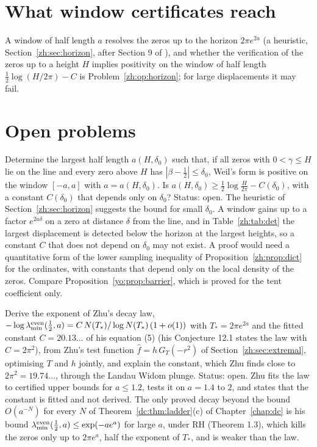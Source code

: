 \section{What window certificates reach}\label{zh:sec:closer}

A window of half length $a$ resolves the zeros up to the horizon $2\pi e^{2a}$ (a heuristic, Section~\ref{zh:sec:horizon}, after Section 9 of \cite{Zhu26}), and whether the verification of the zeros up to a height $H$ implies positivity on the window of half length $\frac12\log(H/2\pi)-C$ is Problem~\ref{zh:op:horizon}; for large displacements it may fail.

\section{Open problems}\label{zh:sec:open}

\begin{problem}\label{zh:op:horizon}
Determine the largest half length $a(H,\delta_0)$ such that, if all zeros with $0<\gamma\le H$ lie on the line and every zero above $H$ has $|\beta-\frac12|\le\delta_0$, Weil's form is positive on the window $[-a,a]$ with $a=a(H,\delta_0)$. Is $a(H,\delta_0)\ge\frac12\log\frac H{2\pi}-C(\delta_0)$, with a constant $C(\delta_0)$ that depends only on $\delta_0$? Status: open. The heuristic of Section~\ref{zh:sec:horizon} suggests the bound for small $\delta_0$. A window gains up to a factor $e^{2a\delta}$ on a zero at distance $\delta$ from the line, and in Table~\ref{zh:tab:det} the largest displacement is detected below the horizon at the largest heights, so a constant $C$ that does not depend on $\delta_0$ may not exist. A proof would need a quantitative form of the lower sampling inequality of Proposition~\ref{zh:prop:dict} for the ordinates, with constants that depend only on the local density of the zeros. Compare Proposition~\ref{yo:prop:barrier}, which is proved for the tent coefficient only.
\end{problem}

\begin{problem}\label{zh:op:decay}
Derive the exponent of Zhu's decay law, $-\log\lambda_{\min}^{\rm even}(\frac12,a)=C\,N(T_*)/\log N(T_*)\,(1+o(1))$ with $T_*=2\pi e^{2a}$ and the fitted constant $C=20.13\ldots$ of his equation (5) (his Conjecture 12.1 \cite{Zhu26} states the law with $C=2\pi^2$), from Zhu's test function $\widehat f=h\,G_T(-r^2)$ of Section~\ref{zh:sec:extremal}, optimising $T$ and $h$ jointly, and explain the constant, which Zhu finds close to $2\pi^2=19.74\ldots$, through the Landau Widom plunge. Status: open. Zhu fits the law to certified upper bounds for $a\le1.2$, tests it on $a=1.4$ to $2$, and states that the constant is fitted and not derived. The only proved decay beyond the bound $O(a^{-N})$ for every $N$ of Theorem~\ref{dc:thm:ladder}(c) of Chapter~\ref{chap:dc} is his bound $\lambda_{\min}^{\rm even}(\frac12,a)\le\exp(-ae^a)$ for large $a$, under RH (Theorem 1.3), which kills the zeros only up to $2\pi e^a$, half the exponent of $T_*$, and is weaker than the law.
\end{problem}

